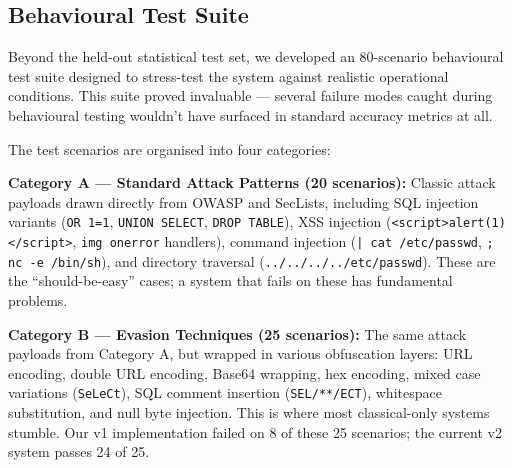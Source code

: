 \documentclass[journal,onecolumn]{IEEEtran}
\begin{document}
\begin{table}[h]
\centering
\caption{Classification Performance by Attack Category}
\label{tab:classification_performance}
\footnotesize

\end{table}

\subsection{Behavioural Test Suite}

Beyond the held-out statistical test set, we developed an 80-scenario behavioural test suite designed to stress-test the system against realistic operational conditions. This suite proved invaluable --- several failure modes caught during behavioural testing wouldn't have surfaced in standard accuracy metrics at all.

The test scenarios are organised into four categories:

\textbf{Category A --- Standard Attack Patterns (20 scenarios):} Classic attack payloads drawn directly from OWASP and SecLists, including SQL injection variants (\texttt{OR 1=1}, \texttt{UNION SELECT}, \texttt{DROP TABLE}), XSS injection (\texttt{<script>alert(1)</script>}, \texttt{img onerror} handlers), command injection (\texttt{| cat /etc/passwd}, \texttt{; nc -e /bin/sh}), and directory traversal (\texttt{../../../../etc/passwd}). These are the ``should-be-easy'' cases; a system that fails on these has fundamental problems.

\textbf{Category B --- Evasion Techniques (25 scenarios):} The same attack payloads from Category A, but wrapped in various obfuscation layers: URL encoding, double URL encoding, Base64 wrapping, hex encoding, mixed case variations (\texttt{SeLeCt}), SQL comment insertion (\texttt{SEL/**/ECT}), whitespace substitution, and null byte injection. This is where most classical-only systems stumble. Our v1 implementation failed on 8 of these 25 scenarios; the current v2 system passes 24 of 25.
\end{document}
